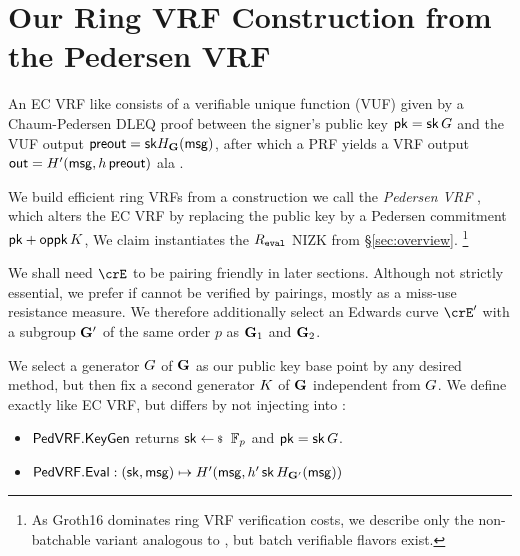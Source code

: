 \section{Our Ring VRF Construction from the Pedersen VRF}
\label{sec:pederson_vrf}

An EC VRF like \cite{nsec5,VXEd25519,draft-irtf-cfrg-vrf-10} consists of
a verifiable unique function (VUF) given by a Chaum-Pedersen DLEQ proof
between the signer's public key $\mathsf{pk} = \mathsf{sk} \, G$ and
 the VUF output ${\mathsf{preout}} = \mathsf{sk} H_{{\mathbf{G}}}(\mathsf{msg})$,
after which a PRF  yields a VRF output
 ${\mathsf{out}} = H'(\mathsf{msg}, h \, {\mathsf{preout}})$ ala \cite[Proposition 1]{vrf_micali}.

We build efficient ring VRFs from a construction we call the
{\em Pedersen VRF} \PedVRF, which alters the EC VRF by replacing the
public key by a Pedersen commitment $\mathsf{pk} + \mathsf{oppk} \, K$,
We claim \PedVRF instantiates the $R_{\mathtt{eval}}$ NIZK from \S\ref{sec:overview}.
\footnote{As Groth16 dominates ring VRF verification costs,
we describe only the non-batchable variant analogous to
\cite{nsec5,VXEd25519,draft-irtf-cfrg-vrf-10}, but
 batch verifiable flavors exist.}


We shall need $\crE$ to be pairing friendly in later sections.
Although not strictly essential, we prefer if \PreOut cannot be verified
by pairings, mostly as a miss-use resistance measure.  We therefore
additionally select an Edwards curve $\crE'$ with a subgroup ${\mathbf{G}}'$
of the same order $p$ as ${\mathbf{G}}_1$ and ${\mathbf{G}}_2$.

We select a generator $G$ of ${\mathbf{G}}$ as our public key base point by
any desired method, but then fix a second generator $K$ of ${\mathbf{G}}$ independent from $G$.
%
We define \KeyGen exactly like EC VRF, but
 \Eval differs by not injecting \pk into \msg:
\begin{itemize}
\item ${\mathsf{PedVRF}}.{\mathsf{KeyGen}}$ \quad returns $\sk \leftsample \F_p$ and $\mathsf{pk} = \mathsf{sk} \, G$.
\item ${\mathsf{PedVRF}}.{\mathsf{Eval}} : (\mathsf{sk},\mathsf{msg}) \mapsto H'(\mathsf{msg}, h' \, \mathsf{sk} \, H_{{\mathbf{G}}'}(\mathsf{msg}))$
\end{itemize}


